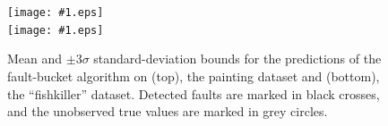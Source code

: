 \documentclass{article}
\newcommand{\psff}[1]{\texttt{[image: \#1.eps]}}
\begin{document}

\begin{figure}
  \centering
  \small
  \psff{painting_big} \\
  \psff{fishkiller}
  \caption{Mean and $\pm3\sigma$ standard-deviation bounds for the
    predictions of the fault-bucket algorithm on (top), the painting
    dataset and (bottom), the ``fishkiller'' dataset.  Detected faults are
    marked in black crosses, and the unobserved true values are marked
    in grey circles.}
  \label{justfb}
\end{figure}
\end{document}
